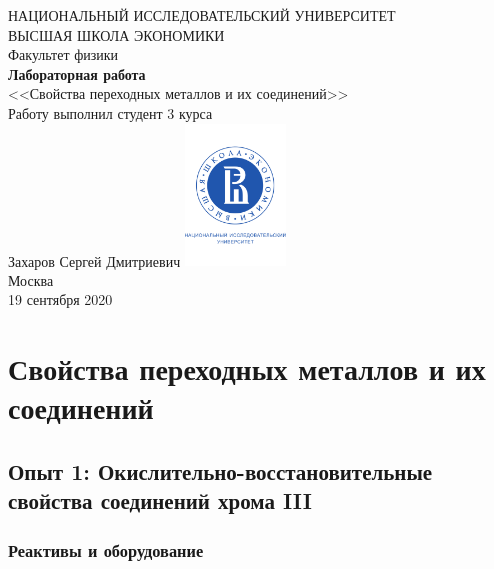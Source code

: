 \documentclass[a4paper, 12pt]{article}
\begin{document}
	\begin{titlepage}
		\begin{center}
			$$$$
			$$$$
			$$$$
			$$$$
			{\Large{НАЦИОНАЛЬНЫЙ ИССЛЕДОВАТЕЛЬСКИЙ УНИВЕРСИТЕТ}}\\
			\vspace{0.1cm}
			{\Large{ВЫСШАЯ ШКОЛА ЭКОНОМИКИ}}\\
			\vspace{0.25cm}
			{\large{Факультет физики}}\\
			\vspace{5.5cm}
			{\Huge\textbf{{Лабораторная работа}}}\\%
			\vspace{1cm}
			{\LARGE{<<Свойства переходных металлов и их соединений>>}}\\%
			\vspace{2cm}
			{Работу выполнил студент 3 курса}\\
			{Захаров Сергей Дмитриевич}
			\vfill
			\includegraphics[width = 0.2\textwidth]{HSElogo}\\
			\vfill
			Москва\\
			19 сентября 2020
		\end{center}
	\end{titlepage}

\tableofcontents

\newpage


\section{Свойства переходных металлов и их соединений}

\subsection{Опыт 1: Окислительно-восстановительные свойства соединений хрома III}

\subsubsection{Реактивы и оборудование}
\end{document}
